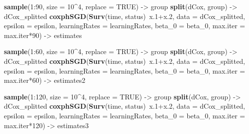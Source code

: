 \documentclass[]{article}
\newenvironment{Shaded}{\begin{snugshade}}{\end{snugshade}}
\newcommand{\KeywordTok}[1]{\textcolor[rgb]{0.13,0.29,0.53}{\textbf{{#1}}}}
\newcommand{\DataTypeTok}[1]{\textcolor[rgb]{0.13,0.29,0.53}{{#1}}}
\newcommand{\DecValTok}[1]{\textcolor[rgb]{0.00,0.00,0.81}{{#1}}}
\newcommand{\FloatTok}[1]{\textcolor[rgb]{0.00,0.00,0.81}{{#1}}}
\newcommand{\StringTok}[1]{\textcolor[rgb]{0.31,0.60,0.02}{{#1}}}
\newcommand{\OtherTok}[1]{\textcolor[rgb]{0.56,0.35,0.01}{{#1}}}
\newcommand{\NormalTok}[1]{{#1}}
\begin{document}
\begin{Shaded}
\begin{Highlighting}[]
  \KeywordTok{sample}\NormalTok{(}\DecValTok{1}\NormalTok{:}\DecValTok{90}\NormalTok{, }\DataTypeTok{size =} \DecValTok{10}\NormalTok{^}\DecValTok{4}\NormalTok{, }\DataTypeTok{replace =} \OtherTok{TRUE}\NormalTok{) ->}\StringTok{ }\NormalTok{group}
  \KeywordTok{split}\NormalTok{(dCox, group) ->}\StringTok{ }\NormalTok{dCox_splitted}
  \KeywordTok{coxphSGD}\NormalTok{(}\KeywordTok{Surv}\NormalTok{(time, status)~x}\FloatTok{.1}\NormalTok{+x}\FloatTok{.2}\NormalTok{, }\DataTypeTok{data =} \NormalTok{dCox_splitted,}
           \DataTypeTok{epsilon =} \NormalTok{epsilon, }\DataTypeTok{learningRates =} \NormalTok{learningRates, }
           \DataTypeTok{beta_0 =} \NormalTok{beta_0, }\DataTypeTok{max.iter =} \NormalTok{max.iter*}\DecValTok{90}\NormalTok{) ->}\StringTok{ }\NormalTok{estimates}

  \KeywordTok{sample}\NormalTok{(}\DecValTok{1}\NormalTok{:}\DecValTok{60}\NormalTok{, }\DataTypeTok{size =} \DecValTok{10}\NormalTok{^}\DecValTok{4}\NormalTok{, }\DataTypeTok{replace =} \OtherTok{TRUE}\NormalTok{) ->}\StringTok{ }\NormalTok{group}
  \KeywordTok{split}\NormalTok{(dCox, group) ->}\StringTok{ }\NormalTok{dCox_splitted}
  \KeywordTok{coxphSGD}\NormalTok{(}\KeywordTok{Surv}\NormalTok{(time, status)~x}\FloatTok{.1}\NormalTok{+x}\FloatTok{.2}\NormalTok{, }\DataTypeTok{data =} \NormalTok{dCox_splitted,}
           \DataTypeTok{epsilon =} \NormalTok{epsilon, }\DataTypeTok{learningRates =} \NormalTok{learningRates,}
           \DataTypeTok{beta_0 =} \NormalTok{beta_0, }\DataTypeTok{max.iter =} \NormalTok{max.iter*}\DecValTok{60}\NormalTok{) ->}\StringTok{ }\NormalTok{estimates2}

  \KeywordTok{sample}\NormalTok{(}\DecValTok{1}\NormalTok{:}\DecValTok{120}\NormalTok{, }\DataTypeTok{size =} \DecValTok{10}\NormalTok{^}\DecValTok{4}\NormalTok{, }\DataTypeTok{replace =} \OtherTok{TRUE}\NormalTok{) ->}\StringTok{ }\NormalTok{group}
  \KeywordTok{split}\NormalTok{(dCox, group) ->}\StringTok{ }\NormalTok{dCox_splitted}
  \KeywordTok{coxphSGD}\NormalTok{(}\KeywordTok{Surv}\NormalTok{(time, status)~x}\FloatTok{.1}\NormalTok{+x}\FloatTok{.2}\NormalTok{, }\DataTypeTok{data =} \NormalTok{dCox_splitted,}
           \DataTypeTok{epsilon =} \NormalTok{epsilon, }\DataTypeTok{learningRates =} \NormalTok{learningRates,}
           \DataTypeTok{beta_0 =} \NormalTok{beta_0, }\DataTypeTok{max.iter =} \NormalTok{max.iter*}\DecValTok{120}\NormalTok{) ->}\StringTok{ }\NormalTok{estimates3}


\end{Highlighting}
\end{Shaded}
\end{document}
